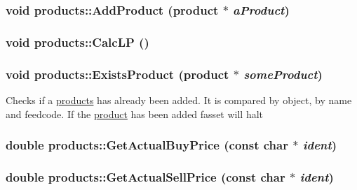 \label{classproducts_a64468cfd7fcbe94794b6d22a59781781}
\hypertarget{classproducts_a3b57167d8acbc0ad1d9fd4bdb1e7ce2a}{
\subsubsection[{AddProduct}]{\setlength{\rightskip}{0pt plus 5cm}void products::AddProduct ({\bf product} $\ast$ {\em aProduct})}}
\label{classproducts_a3b57167d8acbc0ad1d9fd4bdb1e7ce2a}
\hypertarget{classproducts_a209fca31666e9abd3077b88f62e99ca9}{
\subsubsection[{CalcLP}]{\setlength{\rightskip}{0pt plus 5cm}void products::CalcLP ()}}
\label{classproducts_a209fca31666e9abd3077b88f62e99ca9}
\hypertarget{classproducts_ae50bd05450d23bd7d6f48f602c1b515d}{
\subsubsection[{ExistsProduct}]{\setlength{\rightskip}{0pt plus 5cm}void products::ExistsProduct ({\bf product} $\ast$ {\em someProduct})}}
\label{classproducts_ae50bd05450d23bd7d6f48f602c1b515d}
Checks if a \hyperlink{classproducts}{products} has already been added. It is compared by object, by name and feedcode. If the \hyperlink{classproduct}{product} has been added fasset will halt \hypertarget{classproducts_a9c32b675c87621466456bca5bff218f7}{
\subsubsection[{GetActualBuyPrice}]{\setlength{\rightskip}{0pt plus 5cm}double products::GetActualBuyPrice (const char $\ast$ {\em ident})}}
\label{classproducts_a9c32b675c87621466456bca5bff218f7}
\hypertarget{classproducts_a7d77ad348aa0f59a569c5c2debda2052}{
\subsubsection[{GetActualSellPrice}]{\setlength{\rightskip}{0pt plus 5cm}double products::GetActualSellPrice (const char $\ast$ {\em ident})}}
